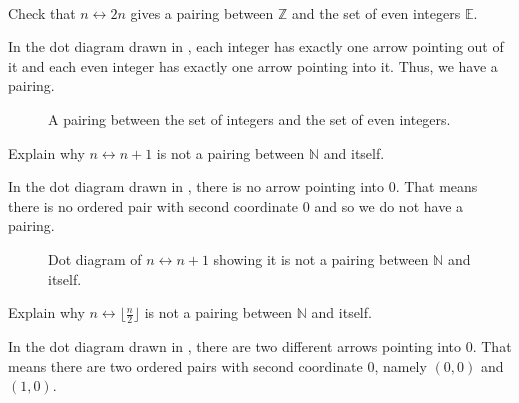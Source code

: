 \begin{exam}
\label{exam_pairing_infinite_sets}
~
    \begin{apart}
        \item Check that $n \leftrightarrow 2n$ gives a pairing between $\mathbb{Z}$ and the set of even integers $\mathbb{E}$.
            \begin{soln}
                In the dot diagram drawn in , each integer has exactly one arrow pointing out of it and each even integer has exactly one arrow pointing into it. Thus, we have a pairing.
            \end{soln}
            \begin{figure}[hbtp]
                \centering
                
                \caption{A pairing between the set of integers and the set of even integers.}
                \label{fig_pairing_int_evens}
            \end{figure}
        \item Explain why $n \leftrightarrow n+1$ is not a pairing between $\mathbb{N}$ and itself. 
                \begin{soln}
                    In the dot diagram drawn in , there is no arrow pointing into 0.  That means there is no ordered pair with second coordinate 0 and so we do not have a pairing.
                \end{soln}
                \begin{figure}[hbtp]
                    \centering
                    
                    \caption{Dot diagram of $n \leftrightarrow n+1$ showing it is not a pairing between $\mathbb{N}$ and itself.}
                    \label{fig_shift_1right_not_pair_naturals}
                \end{figure}
            \item Explain why $n \leftrightarrow \lfloor\frac{n}{2}\rfloor$ is not a pairing between $\mathbb{N}$ and itself. 
                \begin{soln}
                    In the dot diagram drawn in , there are two different arrows pointing into 0. That means there are two ordered pairs with second coordinate 0, namely $(0,0)$ and $(1,0)$.  
                \end{soln}    
                \begin{figure}[hbtp]
                    \centering

\end{figure}
\end{apart}
\end{exam}
